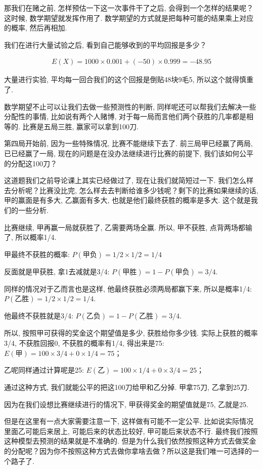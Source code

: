 那我们在赌之前, 怎样预估一下这一次事件干了之后, 会得到一个怎样的结果呢？这时候, 数学期望就发挥作用了. 数学期望的方式就是把每种可能的结果乘上对应的概率, 然后再相加. 

我们在进行大量试验之后, 看到自己能够收到的平均回报是多少？

\begin{align*}
  E(X) = 1000 \times 0.001 + (-50) \times 0.999 = -48.95
\end{align*}

大量进行实验, 平均每一回合我们的这个回报是倒贴48块9毛5, 所以这个就得慎重了. 

数学期望不止可以让我们去做一些预测性的判断, 同样呢还可以帮我们去解决一些分配性的事情, 比如说有两个人赌博, 对于每一局而言他们两个获胜的几率都是相等的. 比赛是五局三胜, 赢家可以拿到100刀. 

第四局开始前, 因为一些特殊情况, 比赛不能继续下去了. 前三局甲已经赢了两局, 已已经赢了一局, 现在的问题是在没办法继续进行比赛的前提下, 我们该如何公平的分配这100刀？

这道题我们之前导论课上其实已经做过了, 现在让我们就简短过一下. 我们怎么样去分析呢？比赛没比完, 怎么样去去判断给谁多少钱呢？剩下的比赛如果继续的话, 甲的赢面是有多大, 乙赢面有多大, 也就是他们最终获胜的概率是多大. 这个就是我们的一些分析. 

比赛继续, 甲再赢一局就获胜了, 乙需要两场全赢. 所以, 甲不获胜, 点背两场都输了, 所以概率1/4. 

甲最终不获胜的概率: $P(\mbox{甲负})= 1/2 \times 1/2 = 1/4$

反面就是甲获胜, 拿1去减就是3/4: $P(\mbox{甲胜}) = 1 - P(\mbox{甲负}) = 3/4. $

同样的情况对于乙而言也是这样, 他最终获胜必须两局都赢下来, 所以是概率1/4: $P(\mbox{乙胜})  = 1/2 \times 1/2 = 1/4$. 

他最终不获胜就是3/4:  $P(\mbox{乙负}) = 1 - P(\mbox{乙胜})  = 3/4$. 

所以, 按照甲可获得的奖金这个期望值是多少, 获胜给你多少钱. 实际上获胜的概率3/4, 不获胜回报0, 不获胜的概率有1/4, 得出来是75: $E(\mbox{甲}) = 100 \times 3/4 + 0 \times 1/4 = 75$；

乙呢同样通过计算呢是25: $E(\mbox{乙}) = 100 \times 1/4 + 0 \times 3/4 = 25$；

通过这种方式, 我们就能公平的把这100刀给甲和乙分掉. 甲拿75刀, 乙拿到25刀. 

因为在我们设想比赛继续进行的情况下, 甲获得奖金的期望值就是75, 乙就是25. 

但是在这里有一点大家需要注意一下, 这样做有可能不一定公平. 比如说实际情况里面乙可能后来居上, 可能后来的状态比较好, 甲可能后来状态不行. 最终我们按照这种模型去预测的结果就是不准确的. 但是为什么我们依然按照这种方式去做奖金的分配呢？因为你不按照这种方式去做你拿啥去做？所以这是我们唯一可选择的一个路子了. 

